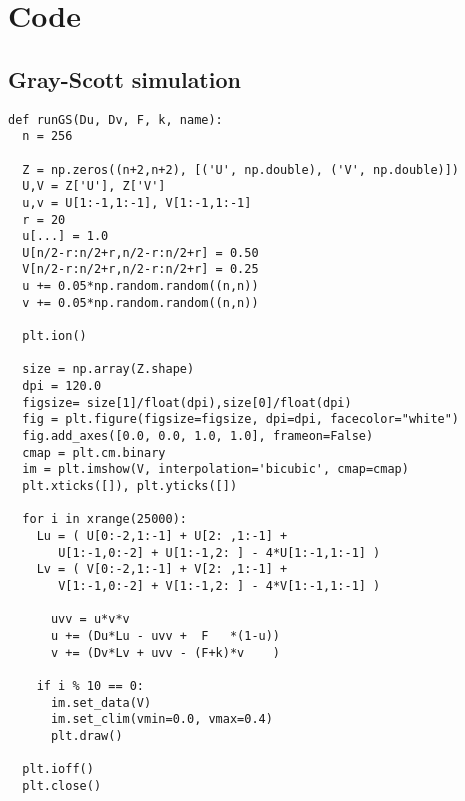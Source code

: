 \chapter{Code}

\section{Gray-Scott simulation} \label{appB:gs-code}

\begin{Verbatim}
def runGS(Du, Dv, F, k, name):
  n = 256

  Z = np.zeros((n+2,n+2), [('U', np.double), ('V', np.double)])
  U,V = Z['U'], Z['V']
  u,v = U[1:-1,1:-1], V[1:-1,1:-1]
  r = 20
  u[...] = 1.0
  U[n/2-r:n/2+r,n/2-r:n/2+r] = 0.50
  V[n/2-r:n/2+r,n/2-r:n/2+r] = 0.25
  u += 0.05*np.random.random((n,n))
  v += 0.05*np.random.random((n,n))

  plt.ion()

  size = np.array(Z.shape)
  dpi = 120.0
  figsize= size[1]/float(dpi),size[0]/float(dpi)
  fig = plt.figure(figsize=figsize, dpi=dpi, facecolor="white")
  fig.add_axes([0.0, 0.0, 1.0, 1.0], frameon=False)
  cmap = plt.cm.binary
  im = plt.imshow(V, interpolation='bicubic', cmap=cmap)
  plt.xticks([]), plt.yticks([])	

  for i in xrange(25000):
    Lu = ( U[0:-2,1:-1] + U[2: ,1:-1] + 
       U[1:-1,0:-2] + U[1:-1,2: ] - 4*U[1:-1,1:-1] )
    Lv = ( V[0:-2,1:-1] + V[2: ,1:-1] + 
       V[1:-1,0:-2] + V[1:-1,2: ] - 4*V[1:-1,1:-1] )

      uvv = u*v*v
      u += (Du*Lu - uvv +  F   *(1-u))
      v += (Dv*Lv + uvv - (F+k)*v    )

    if i % 10 == 0:
      im.set_data(V)
      im.set_clim(vmin=0.0, vmax=0.4)
      plt.draw()

  plt.ioff()
  plt.close()
\end{Verbatim}